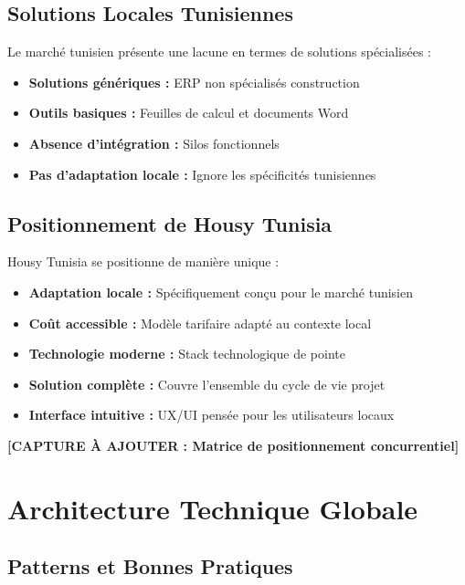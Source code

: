 \subsection{Solutions Locales Tunisiennes}

Le marché tunisien présente une lacune en termes de solutions spécialisées :

\begin{itemize}
    \item \textbf{Solutions génériques :} ERP non spécialisés construction
    \item \textbf{Outils basiques :} Feuilles de calcul et documents Word
    \item \textbf{Absence d'intégration :} Silos fonctionnels
    \item \textbf{Pas d'adaptation locale :} Ignore les spécificités tunisiennes
\end{itemize}

\subsection{Positionnement de Housy Tunisia}

Housy Tunisia se positionne de manière unique :

\begin{itemize}
    \item \textbf{Adaptation locale :} Spécifiquement conçu pour le marché tunisien
    \item \textbf{Coût accessible :} Modèle tarifaire adapté au contexte local
    \item \textbf{Technologie moderne :} Stack technologique de pointe
    \item \textbf{Solution complète :} Couvre l'ensemble du cycle de vie projet
    \item \textbf{Interface intuitive :} UX/UI pensée pour les utilisateurs locaux
\end{itemize}

\textbf{[CAPTURE À AJOUTER : Matrice de positionnement concurrentiel]}

\section{Architecture Technique Globale}

\subsection{Patterns et Bonnes Pratiques}

